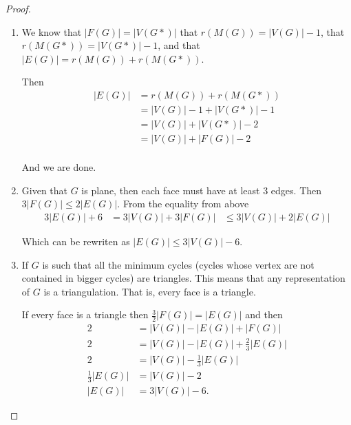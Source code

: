\begin{proof}
    \begin{enumerate}[label=(\roman*)]
        \item
            We know that $|F(G)| = |V(G*)|$ that $r(M(G)) = |V(G)| - 1$, 
            that $r(M(G*)) = |V(G*)| - 1$, and that $|E(G)| = r(M(G)) + r(M(G*))$.\pn
            
            Then
            \begin{align}
                    |E(G)|  &=  r(M(G)) + r(M(G*))          \\
                            &=  |V(G)| - 1 + |V(G*)| - 1    \\
                            &=  |V(G)| + |V(G*)| - 2        \\
                            &=  |V(G)| + |F(G)| - 2        \\
            \end{align}
            
            And we are done.
        \item
            Given that $G$ is plane, then each face must have at least 3 edges.
            Then $3|F(G)| \leq 2|E(G)|$. From the equality from above
            \begin{align}
                    3|E(G)| + 6 &=      3|V(G)| + 3|F(G)|
                                &\leq   3|V(G)| + 2|E(G)|
            \end{align}
            
            Which can be rewriten as $|E(G)| \leq 3|V(G)| - 6$.
            
        \item
            If $G$ is such that all the minimum cycles (cycles whose vertex are not contained in bigger cycles) are 
            triangles. This means that any representation of $G$ is a triangulation. That is, every face is a triangle.\pn
            
            If every face is a triangle then $\frac{3}{2} |F(G)| = |E(G)|$ and then 
            \begin{align}
                   2                    &=  |V(G)| - |E(G)| + |F(G)|                \\
                   2                    &=  |V(G)| - |E(G)| + \frac{2}{3} |E(G)|    \\
                   2                    &=  |V(G)| - \frac{1}{3} |E(G)|             \\
                   \frac{1}{3} |E(G)|   &=  |V(G)| - 2                              \\
                   |E(G)|               &=  3|V(G)| - 6.                             
            \end{align}
            

\end{enumerate}
\end{proof}
